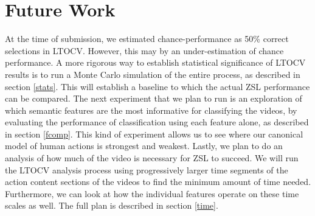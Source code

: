 \documentclass{article}
\begin{document}
\section{Future Work} %
At the time of submission, we estimated chance-performance as 50\% correct selections in LTOCV.  However, this may by an under-estimation of chance performance. A more rigorous way to establish statistical significance of LTOCV results is to run a Monte Carlo simulation of the entire process, as described in section \ref{stats}. This will establish a baseline to which the actual ZSL performance can be compared.
The next experiment that we plan to run is an exploration of which semantic features are the most informative for classifying the videos, by evaluating the performance of classification using each feature alone, as described in section \ref{fcomp}. This kind of experiment allows us to see where our canonical model of human actions is strongest and weakest.
Lastly, we plan to do an analysis of how much of the video is necessary for ZSL to succeed. We will run the LTOCV analysis process using progressively larger time segments of the action content sections of the videos to find the minimum amount of time needed. Furthermore, we can look at how the individual features operate on these time scales as well. The full plan is described in section \ref{time}.


\end{document}
